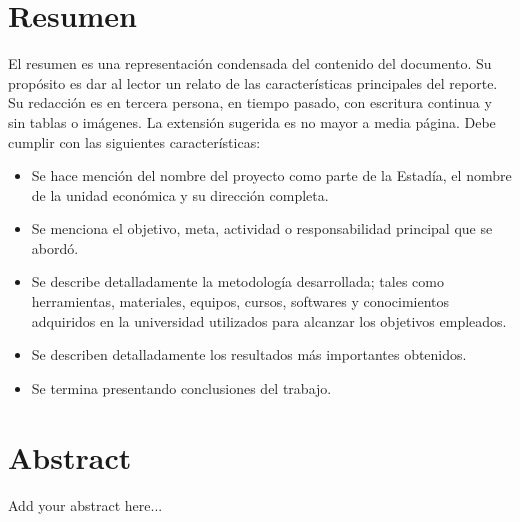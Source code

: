 \documentclass[12pt]{article}
\newcommand{\nasesorinstitucional}{Dr. Said Polanco Martagón}
\begin{document}










\clearpage
\ClearWallPaper
\thispagestyle{fancy}
\section*{Resumen}

El resumen es una representación condensada del contenido del documento. Su propósito es dar al lector un relato de las características principales del reporte. Su redacción es en tercera persona, en tiempo pasado, con escritura continua y sin tablas o imágenes. La extensión sugerida es no mayor a media página. Debe cumplir con las siguientes características:

\begin{itemize}
  \item Se hace mención del nombre del proyecto como parte de la Estadía, el nombre de la unidad económica y su dirección completa.
  \item Se menciona el objetivo, meta, actividad o responsabilidad principal que se abordó.
  \item Se describe detalladamente la metodología desarrollada; tales como herramientas, materiales, equipos, cursos, softwares y conocimientos adquiridos en la universidad utilizados para alcanzar los objetivos empleados.
  \item Se describen detalladamente los resultados más importantes obtenidos.
  \item Se termina presentando conclusiones del trabajo.
\end{itemize}


\clearpage
\thispagestyle{fancy}
\section*{Abstract}
Add your abstract here...
\end{document}

